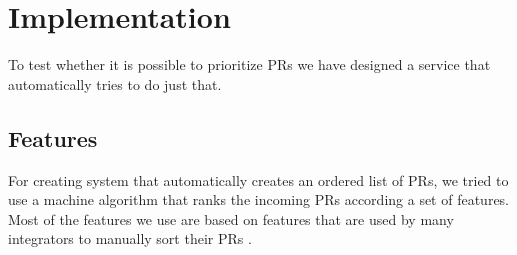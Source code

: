 \section{Implementation}
\label{sec:implementation}

To test whether it is possible to prioritize PRs we have designed a service that automatically tries to do just that.

\subsection{Features}
\label{sec:features}

For creating system that automatically creates an ordered list of PRs, we tried to use a machine algorithm that ranks the incoming PRs according a set of features.
Most of the features we use are based on features that are used by many integrators to manually sort their PRs \cite{GZSD15}.

